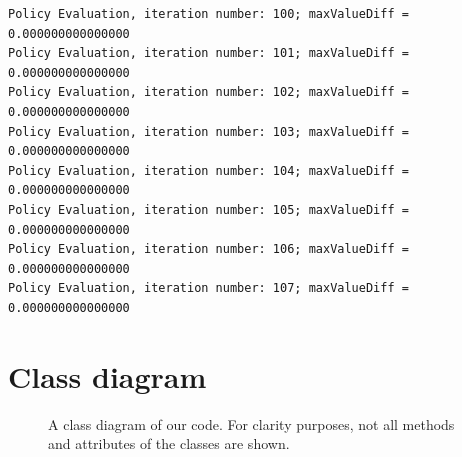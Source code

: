 \documentclass{article}
\begin{document}
\begin{scriptsize}
\begin{verbatim}
Policy Evaluation, iteration number: 100; maxValueDiff = 0.000000000000000 
Policy Evaluation, iteration number: 101; maxValueDiff = 0.000000000000000 
Policy Evaluation, iteration number: 102; maxValueDiff = 0.000000000000000 
Policy Evaluation, iteration number: 103; maxValueDiff = 0.000000000000000 
Policy Evaluation, iteration number: 104; maxValueDiff = 0.000000000000000 
Policy Evaluation, iteration number: 105; maxValueDiff = 0.000000000000000 
Policy Evaluation, iteration number: 106; maxValueDiff = 0.000000000000000 
Policy Evaluation, iteration number: 107; maxValueDiff = 0.000000000000000
\end{verbatim}
\end{scriptsize} 

\section*{}
\clearpage
\section{Class diagram}\label{app:classDiagram}
\begin{figure}[htb]
        \caption{\label{pic:classDiagram} A class diagram of our code. For clarity purposes, not all methods and attributes of the classes are shown.}
\end{figure}



\end{document}
